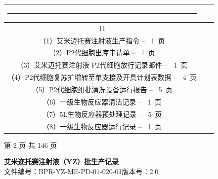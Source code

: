 \documentclass[UTF8,10pt,a4paper,fontset=fandol]{ctexart}
\newcommand{\fieldvalue}[1]{#1}
\newcommand{\handwritten}[1]{#1}
\begin{document}
\begin{tabularx}{\textwidth}{|c|X|p{3.2cm}|}
\rule{9cm}{0.4pt}
& \\
\hline
11 &
\begin{tabular}{@{}l@{}}
附件：\\
（1）艾米迈托赛注射液生产指令 \hfill --\ 
\fieldvalue{\handwritten{1}}\ 页\\
（2）P2代细胞出库申请单 \hfill --\ 
\fieldvalue{\handwritten{1}}\ 页\\
（3）艾米迈托赛注射液 P2代细胞放行记录邮件 \hfill --\ 
\fieldvalue{\handwritten{1}}\ 页\\
（4）P2代细胞复苏扩增转至单支接及开具计划表数据 \hfill --\ 
\fieldvalue{\handwritten{4}}\ 页\\
（5）P2代细胞组批清洗设备运行报告 \hfill --\ 
\fieldvalue{\handwritten{5}}\ 页\\
（6）一级生物反应器清洁记录 \hfill --\ 
\fieldvalue{\handwritten{1}}\ 页\\
（7）5L生物反应器预处理记录 \hfill --\ 
\fieldvalue{\handwritten{5}}\ 页\\
（8）一级生物反应器运行记录 \hfill --\ 
\fieldvalue{\handwritten{1}}\ 页
\end{tabular}
& \\
\hline
\end{tabularx}

\vfill
\begin{center}
第 2 页 共 146 页
\end{center}

\newpage

\begin{center}
\textbf{艾米迩托赛注射液（YZ）批生产记录}\\[2pt]
文件编号：BPR-YZ-ME-PD-01-020-01\qquad 版本号：2.0
\end{center}
\end{document}
